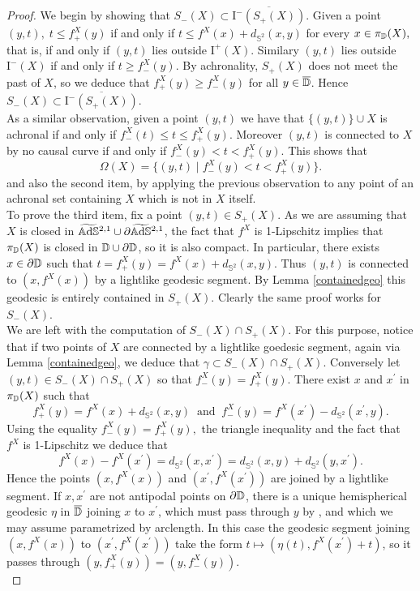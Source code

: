 \begin{proof}
    We begin by showing that $S_-(X)\subset \overline{\text{I}^-(S_+(X))}$. Given a point $(y,t),\;t\leq f_+^X(y)$ if and only if $t\leq f^X(x)+d_{\mathbb{S}^2}(x,y)$ for every $x\in\pi_{\mathbb{D}}(X),$ that is, if and only if $(y,t)$ lies outside $\text{I}^+(X)$. Similary $(y,t)$ lies outside $\text{I}^-(X)$ if and only if $t\geq f_-^X(y).$ By achronality, $S_+(X)$ does not meet the past of $X$, so we deduce that $f_+^X(y)\geq f_-^X(y)$ for all $y\in\overline{\mathbb{D}}$. Hence $S_-(X)\subset \overline{\text{I}^-(S_+(X))}$.\\
    As a similar observation, given a point $(y,t)$ we have that $\{(y,t)\}\cup X$ is achronal if and only if $f_-^X(t)\leq t\leq f_+^X(y)$. Moreover $(y,t)$ is connected to $X$ by no causal curve if and only if $f_-^X(y)<t<f_+^X(y)$. This shows that 
    \[
        \Omega(X)=\{(y,t)\;|\;f_-^X(y)<t<f_+^X(y)\}.
    \]
    and also the second item, by applying the previous observation to any point of an achronal set containing $X$ which is not in $X$ itself. \\
    To prove the third item, fix a point $(y,t)\in S_+(X)$. As we are assuming that $X$ is closed in $\widetilde{\mathbb{A}\mathrm{d}\mathbb{S}}{}^{2,1}\cup\partial\widetilde{\mathbb{A}\mathrm{d}\mathbb{S}}{}^{2,1}$, the fact that $f^X$ is 1-Lipschitz implies that $\pi_{\mathbb{D}}(X)$ is closed in $\mathbb{D}\cup\partial\mathbb{D}$, so it is also compact. In particular, there exists $x\in\partial\mathbb{D}$ such that $t=f_+^X(y)=f^X(x)+d_{\mathbb{S}^2}(x,y)$. Thus $(y,t)$ is connected to $(x,f^X(x))$ by a lightlike geodesic segment. By Lemma \ref{containedgeo} this geodesic is entirely contained in $S_+(X)$. Clearly the same proof works for $S_-(X)$. \\
    We are left with the computation of $S_-(X)\cap S_+(X)$. For this purpose, notice that if two points of $X$ are connected by a lightlike goedesic segment, again via Lemma \ref{containedgeo}, we deduce that $\gamma\subset S_-(X)\cap S_+(X).$ Conversely let $(y,t)\in S_-(X)\cap S_+(X)$ so that $f_-^X(y)=f_+^X(y).$ There exist $x$ and $x^{\prime}$ in $\pi_{\mathbb{D}}(X)$ such that 
    \[
        f_+^X(y)=f^{X}(x)+d_{\mathbb{S}^2}(x,y) \;\;\text{and}\;\;f_-^X(y)=f^X(x^{\prime})-d_{\mathbb{S}^2}(x^{\prime},y). 
    \]
    Using the equality $f_-^X(y)=f_+^X(y),$ the triangle inequality and the fact that $f^X$ is 1-Lipschitz we deduce that 
    \begin{equation}\label{42}
        f^{X}(x)-f^X(x^{\prime})=d_{\mathbb{S}^2}(x,x^{\prime})=d_{\mathbb{S}^2}(x,y)+d_{\mathbb{S}^2}(y,x^{\prime}). 
       \end{equation}
       Hence the points $(x,f^X(x))$ and $(x^{\prime},f^X(x^{\prime} ))$ are joined by a lightlike segment. If $x,x^{\prime}$ are not antipodal points on $\partial\mathbb{D}$, there is a unique hemispherical geodesic $\eta$ in $\overline{\mathbb{D}}$ joining $x$ to $x^{\prime}$, which must pass through $y$ by , and which we may assume parametrized by arclength. In this case the geodesic segment joining $(x,f^X(x))$ to $(x^{\prime},f^X(x^{\prime} ))$ take the form $t\mapsto(\eta(t),f^X(x^{\prime})+t)$, so it passes through $(y,f_+^X(y))=(y,f_-^X(y)).$\\

\end{proof}
